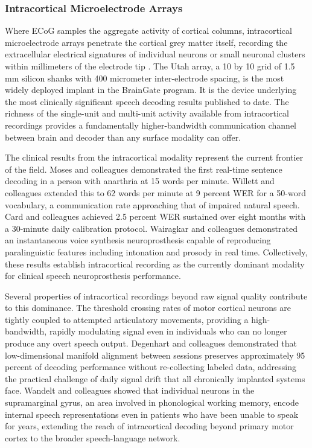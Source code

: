 \subsubsection{Intracortical Microelectrode Arrays}

Where ECoG samples the aggregate activity of cortical columns, intracortical microelectrode arrays penetrate the cortical grey matter itself, recording the extracellular electrical signatures of individual neurons or small neuronal clusters within millimeters of the electrode tip \cite{Wilson2020}. The Utah array, a 10 by 10 grid of 1.5 mm silicon shanks with 400 micrometer inter-electrode spacing, is the most widely deployed implant in the BrainGate program. It is the device underlying the most clinically significant speech decoding results published to date. The richness of the single-unit and multi-unit activity available from intracortical recordings provides a fundamentally higher-bandwidth communication channel between brain and decoder than any surface modality can offer.

The clinical results from the intracortical modality represent the current frontier of the field. Moses and colleagues \cite{Moses2021} demonstrated the first real-time sentence decoding in a person with anarthria at 15 words per minute. Willett and colleagues \cite{Willett2023} extended this to 62 words per minute at 9 percent WER for a 50-word vocabulary, a communication rate approaching that of impaired natural speech. Card and colleagues \cite{Card2024} achieved 2.5 percent WER sustained over eight months with a 30-minute daily calibration protocol. Wairagkar and colleagues \cite{Wairagkar2025} demonstrated an instantaneous voice synthesis neuroprosthesis capable of reproducing paralinguistic features including intonation and prosody in real time. Collectively, these results establish intracortical recording as the currently dominant modality for clinical speech neuroprosthesis performance.

Several properties of intracortical recordings beyond raw signal quality contribute to this dominance. The threshold crossing rates of motor cortical neurons are tightly coupled to attempted articulatory movements, providing a high-bandwidth, rapidly modulating signal even in individuals who can no longer produce any overt speech output. Degenhart and colleagues \cite{Degenhart2020} demonstrated that low-dimensional manifold alignment between sessions preserves approximately 95 percent of decoding performance without re-collecting labeled data, addressing the practical challenge of daily signal drift that all chronically implanted systems face. Wandelt and colleagues \cite{Wandelt2024} showed that individual neurons in the supramarginal gyrus, an area involved in phonological working memory, encode internal speech representations even in patients who have been unable to speak for years, extending the reach of intracortical decoding beyond primary motor cortex to the broader speech-language network.

